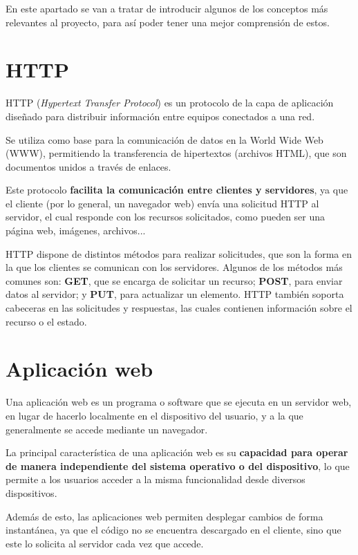 
En este apartado se van a tratar de introducir algunos de los conceptos más relevantes al proyecto, para así poder tener una mejor comprensión de estos.

\section{HTTP}

HTTP (\textit{Hypertext Transfer Protocol}) es un protocolo de la capa de aplicación diseñado para distribuir información entre equipos conectados a una red. 

Se utiliza como base para la comunicación de datos en la World Wide Web (WWW), permitiendo la transferencia de hipertextos (archivos HTML), que son documentos unidos a través de enlaces. 

Este protocolo \textbf{facilita la comunicación entre clientes y servidores}, ya que el cliente (por lo general, un navegador web) envía una solicitud HTTP al servidor, el cual responde con los recursos solicitados, como pueden ser una página web, imágenes, archivos... \cite{cloudflare:http}

HTTP dispone de distintos métodos para realizar solicitudes, que son la forma en la que los clientes se comunican con los servidores. Algunos de los métodos más comunes son: \textbf{GET}, que se encarga de solicitar un recurso; \textbf{POST}, para enviar datos al servidor; y \textbf{PUT}, para actualizar un elemento. HTTP también soporta cabeceras en las solicitudes y respuestas, las cuales contienen información sobre el recurso o el estado.

\section{Aplicación web}

Una aplicación web es un programa o software que se ejecuta en un servidor web, en lugar de hacerlo localmente en el dispositivo del usuario, y a la que generalmente se accede mediante un navegador.

La principal característica de una aplicación web es su \textbf{capacidad para operar de manera independiente del sistema operativo o del dispositivo}, lo que permite a los usuarios acceder a la misma funcionalidad desde diversos dispositivos.

Además de esto, las aplicaciones web permiten desplegar cambios de forma instantánea, ya que el código no se encuentra descargado en el cliente, sino que este lo solicita al servidor cada vez que accede.

